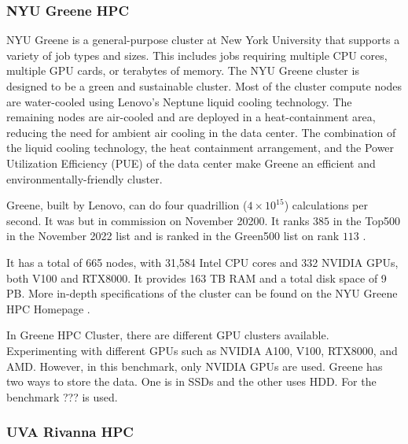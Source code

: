\documentclass[sigplan,screen]{acmart}
\begin{document}

\subsubsection{NYU Greene HPC}

NYU Greene is a general-purpose cluster at New York University that supports a variety of job types and sizes. This includes jobs requiring multiple CPU cores, multiple GPU cards, or terabytes of memory. The NYU Greene cluster is designed to be a green and sustainable cluster. Most of the cluster compute nodes are water-cooled using Lenovo's Neptune liquid cooling technology. The remaining nodes are air-cooled and are deployed in a heat-containment area, reducing the need for ambient air cooling in the data center. The combination of the liquid cooling technology, the heat containment arrangement, and the Power Utilization Efficiency (PUE) of the data center make Greene an efficient and environmentally-friendly cluster. 

Greene, built by Lenovo, can do four quadrillion ($4 \times 10^{15}$) calculations per second. It was but in commission on November 20200. It ranks $385$  in the Top500 in the November 2022 list and is ranked in the Green500 list on rank $113$ \cite{top500-greene}. 

It has a total of 665 nodes, with 31,584 Intel CPU cores and 332 NVIDIA GPUs, both V100 and RTX8000. It provides 163 TB RAM and a total disk space of 9 PB. More in-depth specifications of the cluster can be found on the NYU Greene HPC Homepage \cite{www-greene}.



In Greene HPC Cluster, there are different GPU clusters available. Experimenting with different GPUs such as 
NVIDIA A100, V100, RTX8000, and AMD. However, in this benchmark, only NVIDIA GPUs are used.  Greene has two ways to store the data. One is in SSDs and the other uses HDD. For the benchmark ??? is used. 


\subsubsection{UVA Rivanna HPC}
\end{document}
